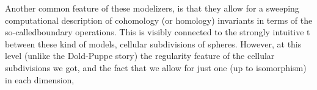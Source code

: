 Another common feature of these modelizers, is that they allow for
a sweeping computational description of cohomology (or homology) invariants
in terms of the so-calledboundary operations. This is visibly connected
to the \hand{(}strongly intuitive\hand{)} t between these kind of models,  cellular
subdivisions of spheres. However, at this level (unlike the Dold-Puppe
story) the regularity feature of the cellular subdivisions we got, and
the fact that we allow for just one (up to isomorphism) in each dimension,

